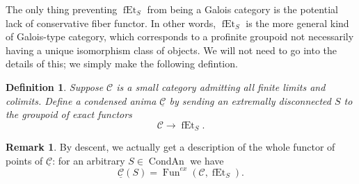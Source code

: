 \documentclass[12pt]{article}
\newtheorem{definition}[theorem]{Definition}
\theoremstyle{definition}
\newtheorem{remark}[theorem]{Remark}
\newcommand{\on}{\operatorname}
\newcommand{\mc}{\mathcal}
\newcommand{\ul}{\underline}
\begin{document}
The only thing preventing $\on{fEt}_S$ from being a Galois category is the potential lack of conservative fiber functor.  In other words, $\on{fEt}_S$ is the more general kind of Galois-type category, which corresponds to a profinite groupoid not necessarily having a unique isomorphism class of objects.  We will not need to go into the details of this; we simply make the following defintion.

\begin{definition}\label{galtocond}
Suppose $\mc{C}$ is a small category admitting all finite limits and colimits.  Define a condensed anima $\ul{\mc{C}}$ by sending an extremally disconnected $S$ to the groupoid of exact functors
$$\mc{C} \to \on{fEt}_S.$$
\end{definition}

\begin{remark}
By descent, we actually get a description of the whole functor of points of $\ul{\mc{C}}$: for an arbitrary $S\in\on{CondAn}$ we have
$$\ul{\mc{C}}(S) = \on{Fun}^{ex}(\mc{C},\on{fEt}_S).$$
\end{remark}
\end{document}
